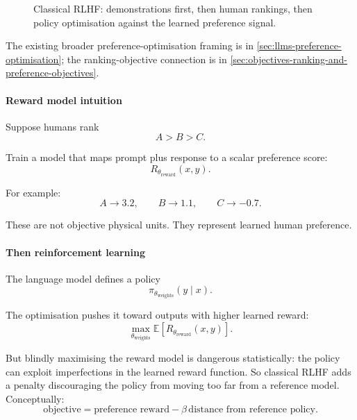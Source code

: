 \begin{figure}[htbp]
\centering
{}
\caption{Classical RLHF: demonstrations first, then human rankings, then policy optimisation against the learned preference signal.}
\label{fig:modern-rlhf-pipeline}
\end{figure}

The existing broader preference-optimisation framing is in \cref{sec:llms-preference-optimisation}; the ranking-objective connection is in \cref{sec:objectives-ranking-and-preference-objectives}.

\paragraph*{Reward model intuition}
Suppose humans rank
\[
A>B>C.
\]

Train a model that maps prompt plus response to a scalar preference score:
\[
R_{\theta_{\text{reward}}}(x,y).
\]

For example:
\[
A\rightarrow3.2,
\qquad
B\rightarrow1.1,
\qquad
C\rightarrow-0.7.
\]

These are not objective physical units.
They represent learned human preference.

\paragraph*{Then reinforcement learning}
The language model defines a policy
\[
\pi_{\theta_{\text{weights}}}(y\mid x).
\]

The optimisation pushes it toward outputs with higher learned reward:
\[
\max_{\theta_{\text{weights}}}
\mathbb E[R_{\theta_{\text{reward}}}(x,y)].
\]

But blindly maximising the reward model is dangerous statistically: the policy can exploit imperfections in the learned reward function.
So classical RLHF adds a penalty discouraging the policy from moving too far from a reference model.
Conceptually:
\[
\boxed{
\text{objective}
=
\text{preference reward}
-
\beta\,\text{distance from reference policy}
}.
\]


